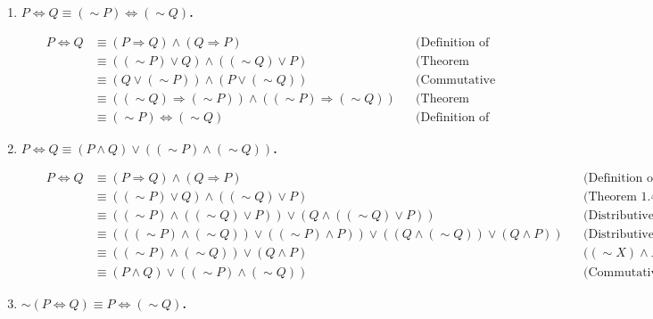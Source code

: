 \documentclass[10pt]{article}
\begin{document}
\begin{enumerate}[label=(\alph*)]

    \item \textbf{$P \Leftrightarrow Q \equiv (\sim P) \Leftrightarrow (\sim Q)$.}

    \begin{align*}
        && P \Leftrightarrow Q &\equiv (P \Rightarrow Q) \wedge (Q \Rightarrow P) && 
        \text{(Definition of a biconditional)} \\
        && &\equiv ((\sim P) \vee Q) \wedge ((\sim Q) \vee P) && \text{(Theorem 1.48)} \\
        && &\equiv (Q \vee (\sim P)) \wedge (P \vee (\sim Q)) && \text{(Commutative property)} \\
        && &\equiv ((\sim Q) \Rightarrow (\sim P)) \wedge ((\sim P) \Rightarrow (\sim Q)) &&
        \text{(Theorem 1.48)} \\
        && &\equiv (\sim P) \Leftrightarrow (\sim Q) && \text{(Definition of a biconditional)}
    \end{align*}

    \item \textbf{$P \Leftrightarrow Q \equiv (P \wedge Q) \vee ((\sim P) \wedge
        (\sim Q))$.}

    \begin{align*}
        && P \Leftrightarrow Q &\equiv (P \Rightarrow Q) \wedge (Q \Rightarrow P) &&
        \text{(Definition of a biconditional)} \\
        && &\equiv ((\sim P) \vee Q) \wedge ((\sim Q) \vee P) && \text{(Theorem 1.48)} \\
        && &\equiv ((\sim P) \wedge ((\sim Q) \vee P)) \vee (Q \wedge ((\sim Q) \vee P)) &&
        \text{(Distributive property)} \\
        && &\equiv (((\sim P) \wedge (\sim Q)) \vee ((\sim P) \wedge P)) \vee 
        ((Q \wedge (\sim Q)) \vee (Q \wedge P)) && \text{(Distributive property)} \\
        && &\equiv ((\sim P) \wedge (\sim Q)) \vee (Q \wedge P) && \text{($(\sim X) \wedge X = F$)} \\
        && &\equiv (P \wedge Q) \vee ((\sim P) \wedge (\sim Q)) && \text{(Commutative property)}
    \end{align*}

    \item \textbf{$\sim (P \Leftrightarrow Q) \equiv P \Leftrightarrow (\sim Q)$.}
        

\end{enumerate}
\end{document}
